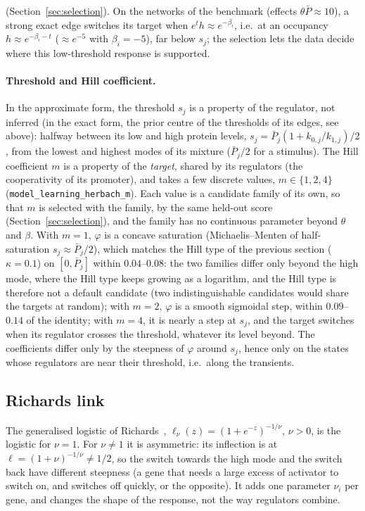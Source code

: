 \documentclass[a4paper, 11pt]{article}
\theoremstyle{plain}
\theoremstyle{remark}
\begin{document}
(Section~\ref{sec:selection}). On the networks of the benchmark (effects $\theta\bar P \approx 10$), a strong exact edge switches its target when $e^{t}h \approx e^{-\beta_i}$, i.e.\ at an occupancy $h \approx e^{-\beta_i - t}$ ($\approx e^{-5}$ with $\beta_i = -5$), far below $s_j$; the selection lets the data decide where this low-threshold response is supported.

\paragraph{Threshold and Hill coefficient.} In the approximate form, the threshold $s_j$ is a property of the regulator, not inferred (in the exact form, the prior centre of the thresholds of its edges, see above): halfway between its low and high protein levels, $s_j = \bar P_j(1 + k_{0,j}/k_{1,j})/2$, from the lowest and highest modes of its mixture ($\bar P_j/2$ for a stimulus). The Hill coefficient $m$ is a property of the \emph{target}, shared by its regulators (the cooperativity of its promoter), and takes a few discrete values, $m \in \{1, 2, 4\}$ (\texttt{model\_learning\_herbach\_m}). Each value is a candidate family of its own, so that $m$ is selected with the family, by the same held-out score (Section~\ref{sec:selection}), and the family has no continuous parameter beyond $\theta$ and $\beta$. With $m = 1$, $\varphi$ is a concave saturation (Michaelis--Menten of half-saturation $s_j \approx \bar P_j/2$), which matches the Hill type of the previous section ($\kappa = 0.1$) on $[0, \bar P_j]$ within $0.04$--$0.08$: the two families differ only beyond the high mode, where the Hill type keeps growing as a logarithm, and the Hill type is therefore not a default candidate (two indistinguishable candidates would share the targets at random); with $m = 2$, $\varphi$ is a smooth sigmoidal step, within $0.09$--$0.14$ of the identity; with $m = 4$, it is nearly a step at $s_j$, and the target switches when its regulator crosses the threshold, whatever its level beyond. The coefficients differ only by the steepness of $\varphi$ around $s_j$, hence only on the states whose regulators are near their threshold, i.e.\ along the transients.

\subsection{Richards link}\label{sec:richards}

The generalised logistic of Richards~\cite{richards1959flexible}, $\ell_\nu(z) = (1 + e^{-z})^{-1/\nu}$, $\nu > 0$, is the logistic for $\nu = 1$. For $\nu \neq 1$ it is asymmetric: its inflection is at $\ell = (1 + \nu)^{-1/\nu} \neq 1/2$, so the switch towards the high mode and the switch back have different steepness (a gene that needs a large excess of activator to switch on, and switches off quickly, or the opposite). It adds one parameter $\nu_i$ per gene, and changes the shape of the response, not the way regulators combine.
\end{document}
